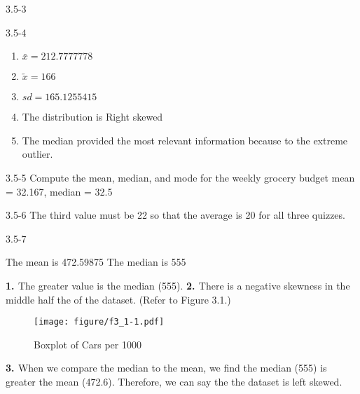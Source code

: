 \begin{exsol@solution}{3.5-3}


\end{exsol@solution}
\begin{exsol@solution}{3.5-4}
\begin{enumerate}
\item $\bar{x} = 212.7777778$
\item $\tilde{x} = 166$
\item $sd = 165.1255415 $
\item The distribution is Right skewed
\item The median provided the most relevant information because to the extreme outlier.
\end{enumerate}

\end{exsol@solution}
\begin{exsol@solution}{3.5-5}
	Compute the mean, median, and mode for the weekly grocery budget
	mean = 32.167, median = 32.5

\end{exsol@solution}
\begin{exsol@solution}{3.5-6}
	The third value must be 22 so that the average is 20 for all three quizzes.

\end{exsol@solution}
\begin{exsol@solution}{3.5-7}



    The mean is 472.59875
    The median is 555

{\bf{1. }} The greater value is the median (555).  {\bf{2. }} There is a negative skewness in the middle half the of the dataset.  (Refer to Figure 3.1.)

\begin{figure}[htbp] %
   \centering
   \texttt{[image: figure/f3\_1-1.pdf]}
   \caption{Boxplot of Cars per 1000}
   \label{fig:f3_1}
\end{figure}

{\bf{3. }} When we compare the median to the mean, we find the median (555) is greater the mean (472.6).  Therefore, we can say the the dataset is left skewed.

\end{exsol@solution}
